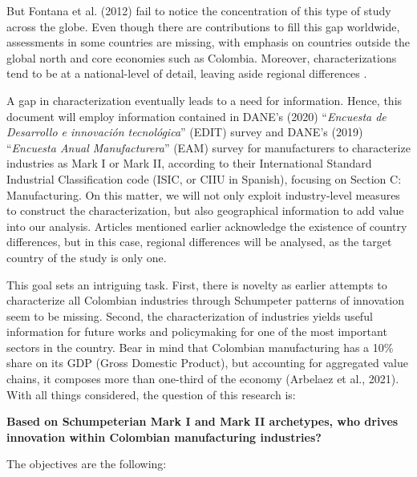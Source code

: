 \documentclass[12pt,a4paper]{article}
\begin{document}
But Fontana et al. (2012) fail to notice the concentration of this type of study across the globe. Even though there are contributions to fill this gap worldwide, assessments in some countries are missing, with emphasis on countries outside the global north and core economies such as Colombia. Moreover, characterizations tend to be at a national-level of detail, leaving aside regional differences .

A gap in characterization eventually leads to a need for information. Hence, this document will employ information contained in DANE's (2020) “\textit{Encuesta de Desarrollo e innovación tecnológica}” (EDIT) survey and DANE's (2019) “\textit{Encuesta Anual Manufacturera}” (EAM) survey for manufacturers to characterize industries as Mark I or Mark II, according to their International Standard Industrial Classification code (ISIC, or CIIU in Spanish), focusing on Section C: Manufacturing. On this matter, we will not only exploit industry-level measures to construct the characterization, but also geographical information to add value into our analysis. Articles mentioned earlier acknowledge the existence of country differences, but in this case, regional differences will be analysed, as the target country of the study is only one.

This goal sets an intriguing task. First, there is novelty as earlier attempts to characterize all Colombian industries through Schumpeter patterns of innovation seem to be missing. Second, the characterization of industries yields useful information for future works and policymaking for one of the most important sectors in the country. Bear in mind that Colombian manufacturing has a 10\% share on its GDP (Gross Domestic Product), but accounting for aggregated value chains, it composes more than one-third of the economy (Arbelaez et al., 2021). With all things considered, the question of this research is: 



\begin{center}
	\textbf{Based on Schumpeterian Mark I and Mark II archetypes, who drives innovation within Colombian manufacturing industries?}
\end{center}

The objectives are the following:
\end{document}
